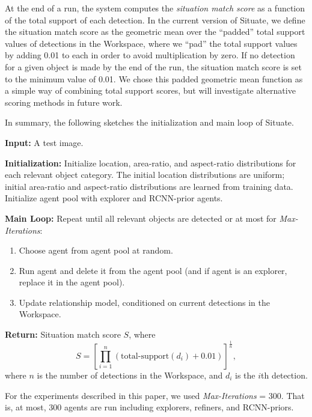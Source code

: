 \documentclass[conference]{IEEEtran}
\begin{document}
At the end of a run, the system computes the {\it
  situation match score} as a function of the total support of each
detection.  In the current version of Situate, we define the situation
match score as the geometric mean over the ``padded'' total support
values of detections in the Workspace, where we ``pad'' the total
support values by adding 0.01 to each in order to avoid multiplication
by zero.  If no detection for a given object is made by the end of the
run, the situation match score is set to the minimum value of 0.01.
We chose this padded geometric mean function as a simple way of
combining total support scores, but will investigate alternative
scoring methods in future work.

In summary, the following sketches the initialization and main loop of Situate. 
\begin{list}{}{}
\item {\bf Input:} A test image. 
\item {\bf Initialization:} Initialize location, area-ratio, and
  aspect-ratio distributions for each relevant object category.  The
  initial location distributions are uniform; initial area-ratio and
  aspect-ratio distributions are learned from training data.
  Initialize agent pool with explorer and RCNN-prior agents. 
\item {\bf Main Loop:} Repeat until all relevant objects are detected or at most for {\it Max-Iterations}: 
\begin{enumerate}
     \item Choose agent from agent pool at random. 
     \item Run agent and delete it from the agent pool (and if agent
       is an explorer, replace it in the agent pool).
     \item Update relationship model, conditioned on current detections in the Workspace. 
\end{enumerate}
\item {\bf Return:} Situation match score $S$, where
\begin{equation}
S = \left[\prod_{i=1}^{n} \left( \text{total-support}(d_i) + 0.01\right) \right]^\frac{1}{n}, 
\end{equation}
where $n$ is the number of detections in the Workspace, and $d_i$ is the $i$th detection.  
\end{list}
For the experiments described in this paper, we used {\it
  Max-Iterations} = 300.  That is, at most, 300 agents are run
including explorers, refiners, and RCNN-priors. 
\end{document}
